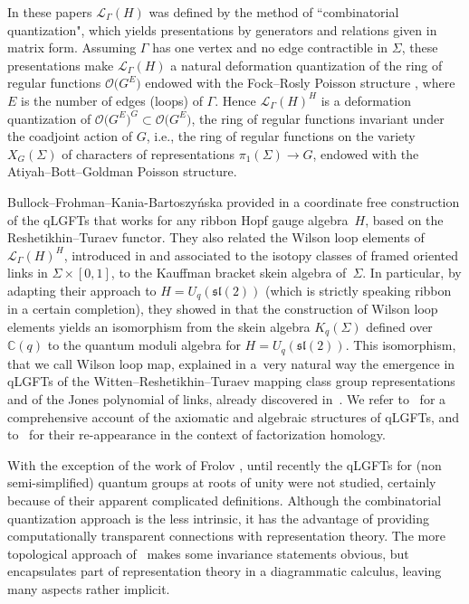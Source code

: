 \documentclass[pdftex]{sigma}%
\numberwithin{equation}{section}
\numberwithin{figure}{section}
\newcommand{\mc}{\mathbb{C}}
\newcommand{\Ll}{{\mathcal L}}
\newcommand{\ra}{\rightarrow}
\begin{document}
In these papers $\Ll_\Gamma(H)$ was defined by the method of ``combinatorial quantization", which yields presentations by generators and relations given in matrix form. Assuming $\Gamma$ has one vertex and no edge contractible in $\Sigma$, these presentations make $\Ll_\Gamma(H)$ a natural deformation quantization of the ring of regular functions $\mathcal{O}\big(G^E\big)$ endowed with the Fock--Rosly Poisson structure \cite{AM0,AM,FR}, where $E$ is the number of edges (loops) of $\Gamma$. Hence $\Ll_\Gamma(H)^H$ is a deformation quantization of $\mathcal{O}\big(G^E\big)^G \subset \mathcal{O}\big(G^E\big)$, the ring of regular functions invariant under the coadjoint action of $G$, i.e., the ring of regular functions on the variety $X_G(\Sigma)$ of characters of representations $\pi_1(\Sigma) \ra G$, endowed with the Atiyah--Bott--Goldman Poisson structure.

Bullock--Frohman--Kania-Bartoszy\'nska provided in \cite{BFK} a coordinate free construction of the qLGFTs that works for any ribbon Hopf gauge algebra~$H$, based on the Reshetikhin--Turaev functor. They also related the Wilson loop elements of $\Ll_\Gamma(H)^H$, introduced in \cite{BR2} and associated to the isotopy classes of framed oriented links in $\Sigma \times [0,1]$, to the Kauffman bracket skein algebra of~$\Sigma$. In particular, by adapting their approach to $H=U_q({\mathfrak{sl}}(2))$ (which is strictly speaking ribbon in a certain completion), they showed in \cite{BFK2} that the construction of Wilson loop elements yields an isomorphism from the skein algebra $K_q(\Sigma)$ defined over $\mc(q)$ to the quantum moduli algebra for $H=U_q({\mathfrak{sl}}(2))$. This isomorphism, that we call Wilson loop map, explained in a~very natural way the emergence in qLGFTs of the Witten--Reshetikhin--Turaev mapping class group representations and of the Jones polynomial of links, already discovered in~\cite{AS,BR2}. We refer to~\cite{MW} for a comprehensive account of the axiomatic and algebraic structures of qLGFTs, and to~\cite{B-BZ-J} for their re-appearance in the context of factorization homology.

With the exception of the work of Frolov \cite{Fro}, until recently the qLGFTs for (non semi-simplified) quantum groups at roots of unity were not studied, certainly because of their apparent complicated definitions. Although the combinatorial quantization approach is the less intrinsic, it has the advantage of providing computationally transparent connections with representation theory. The more topological approach of~\cite{BFK} makes some invariance statements obvious, but encapsulates part of representation theory in a diagrammatic calculus, leaving many aspects rather implicit.
\end{document}

